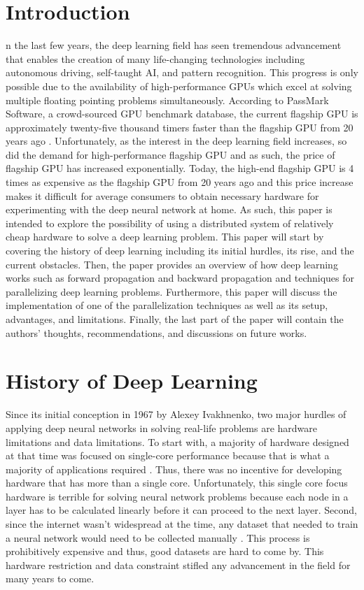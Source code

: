 \documentclass{IEEEtran}
\begin{document}
    \section{Introduction}
        n the last few years, the deep learning field has seen tremendous advancement that enables the creation of many life-changing technologies including autonomous driving, self-taught AI, and pattern recognition. This progress is only possible due to the availability of high-performance GPUs which excel at solving multiple floating pointing problems simultaneously. According to PassMark Software, a crowd-sourced GPU benchmark database, the current flagship GPU is approximately twenty-five thousand timers faster than the flagship GPU from 20 years ago \cite{passmark_software}. Unfortunately, as the interest in the deep learning field increases, so did the demand for high-performance flagship GPU and as such, the price of flagship GPU has increased exponentially. Today, the high-end flagship GPU is 4 times as expensive as the flagship GPU from 20 years ago \cite{passmark_software} and this price increase makes it difficult for average consumers to obtain necessary hardware for experimenting with the deep neural network at home. As such, this paper is intended to explore the possibility of using a distributed system of relatively cheap hardware to solve a deep learning problem. This paper will start by covering the history of deep learning including its initial hurdles, its rise, and the current obstacles. Then, the paper provides an overview of how deep learning works such as forward propagation and backward propagation and techniques for parallelizing deep learning problems. Furthermore, this paper will discuss the implementation of one of the parallelization techniques as well as its setup, advantages, and limitations. Finally, the last part of the paper will contain the authors’ thoughts, recommendations, and discussions on future works.
    
    \section{History of Deep Learning}
        Since its initial conception in 1967 by Alexey Ivakhnenko, two major hurdles of applying deep neural networks in solving real-life problems are hardware limitations and data limitations. To start with, a majority of hardware designed at that time was focused on single-core performance because that is what a majority of applications required \cite{inproceedings}. Thus, there was no incentive for developing hardware that has more than a single core. Unfortunately, this single core focus hardware is terrible for solving neural network problems because each node in a layer has to be calculated linearly before it can proceed to the next layer. Second, since the internet wasn’t widespread at the time, any dataset that needed to train a neural network would need to be collected manually \cite{pew_research_center}. This process is prohibitively expensive and thus, good datasets are hard to come by. This hardware restriction and data constraint stifled any advancement in the field for many years to come.
\end{document}
